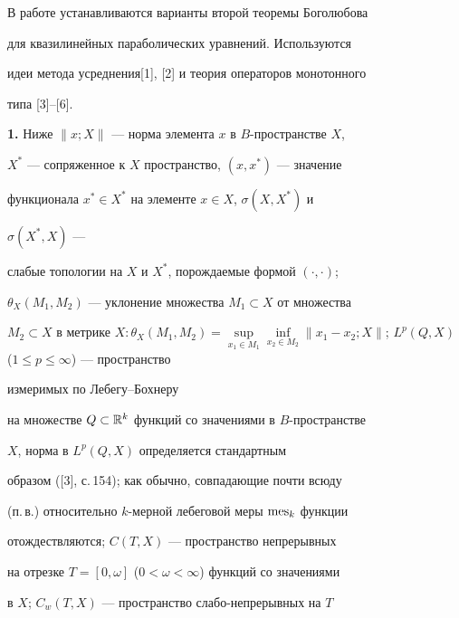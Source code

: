 \maketitle 


\label{begin} 


 


 


В работе устанавливаются варианты второй теоремы Боголюбова 


для квазилинейных параболических уравнений. Используются 


идеи метода усреднения[1], [2] и теория операторов монотонного 


типа [3]--[6]. 


\medskip 


 


{\bf 1.} Ниже $\|x;X\|$ --- норма элемента $x$ в $B$-пространстве $X$, 


$X^*$ --- сопряженное к $X$ пространство, $(x,x^*)$ --- значение 


функционала $x^*\in X^*$ на элементе $x\in X$, $\sigma(X,X^*)$ и 


$\sigma(X^*,X)$ --- 


слабые топологии на $X$ и $X^*$, порождаемые формой $(\cdot,\cdot)$; 


$\theta_X(M_1,M_2)$ --- уклонение множества $M_1\subset X$ от множества 


$M_2\subset X$ в метрике $X: 


\theta_X(M_1,M_2)=\sup\limits_{x_1\in M_1} \inf\limits_{x_2\in 


M_2}\|x_1-x_2;X\|$; $L^p(Q,X)$ ($1\le p\le\infty$) --- пространство 


измеримых по Лебегу--Бохнеру 


на множестве $Q\subset\Bbb R^k$ функций со значениями в $B$-пространстве 


$X$, норма в $L^p(Q,X)$ определяется стандартным 


образом ([3], с.\,154); как обычно, совпадающие почти всюду 


(п.\,в.) относительно $k$-мерной лебеговой меры $\operatorname{mes}_k$ функции 


отождествляются; $C(T,X)$ --- пространство непрерывных 


на отрезке $T=[0,\omega]$ ($0<\omega<\infty$) функций со значениями 


в $X$; $C_w(T,X)$ --- пространство слабо-непрерывных на $T$ 


